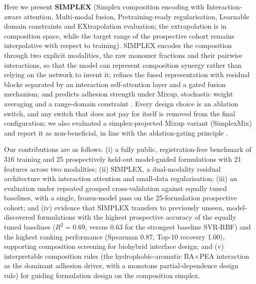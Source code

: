 \documentclass[utf8]{FrontiersinHarvard}
\begin{document}
Here we present \textbf{SIMPLEX} (Simplex composition encoding with Interaction-aware attention, Multi-modal fusion, Pretraining-ready regularisation, Learnable domain constraints and EXtrapolation evaluation; the extrapolation is in composition space, while the target range of the prospective cohort remains interpolative with respect to training). SIMPLEX encodes the composition through two explicit modalities, the raw monomer fractions and their pairwise interactions, so that the model can represent composition synergy rather than relying on the network to invent it; refines the fused representation with residual blocks separated by an interaction self-attention layer and a gated fusion mechanism; and predicts adhesion strength under Mixup, stochastic weight averaging and a range-domain constraint \cite{he2016resnet,kingma2015adam,loshchilov2019adamw,smith2019onecycle,hornik1989mlp,vaswani2017attention,perez2018film,foret2021sam,srivastava2014dropout,ioffe2015batchnorm,hendrycks2016gelu,yun2020transformers,shahriari2016bayesian,chu2020smooth,chen2022activelearning,snelson2006gp,settles2009al,recent2021karniadaki,recent2022cuomo,recent2023pyun,recent2025xue,recent2024wang}. Every design choice is an ablation switch, and any switch that does not pay for itself is removed from the final configuration; we also evaluated a simplex-projected Mixup variant (SimplexMix) and report it as non-beneficial, in line with the ablation-gating principle \cite{egozcue2003clr,cole2020design,wang2023hydrogelML,pawlowsky2015modeling}.

Our contributions are as follows. (i) a fully public, registration-free benchmark of 316 training and 25 prospectively held-out model-guided formulations with 21 features across two modalities; (ii) SIMPLEX, a dual-modality residual architecture with interaction attention and small-data regularisation; (iii) an evaluation under repeated grouped cross-validation against equally tuned baselines, with a single, frozen-model pass on the 25-formulation prospective cohort; and (iv) evidence that SIMPLEX transfers to previously unseen, model-discovered formulations with the highest prospective accuracy of the equally tuned baselines ($R^2 = 0.69$, versus 0.63 for the strongest baseline SVR-RBF) and the highest ranking performance (Spearman $0.87$, Top-10 recovery 1.00), supporting composition screening for biohybrid interface design; and (v) interpretable composition rules (the hydrophobic-aromatic BA$\times$PEA interaction as the dominant adhesion driver, with a monotone partial-dependence design rule) for guiding formulation design on the composition simplex.
\end{document}
